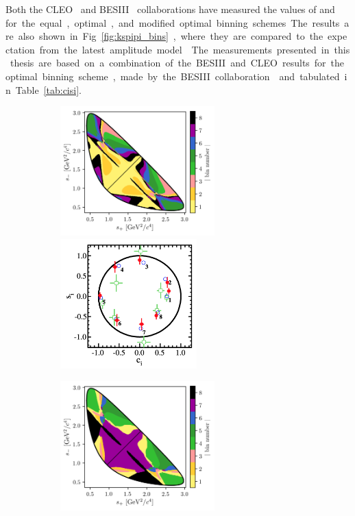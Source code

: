 Both the CLEO~\cite{CLEOCISI} and BESIII~\cite{BESCISI} collaborations have measured the values of \ci and \si for the equal, optimal, and modified optimal binning schemes. The results are also shown in Fig.~\ref{fig:kspipi_bins}, where they are  compared to the expectation from the latest amplitude model~\cite{Belle2018}. The measurements presented in this thesis are based on a combination of the BESIII and CLEO results for the optimal binning scheme, made by the BESIII collaboration~\cite{BESCISI} and tabulated in Table~\ref{tab:cisi}. 

\begin{figure}[p]
    \centering
    \begin{subfigure}{\columnwidth}
        \centering
        \includegraphics[height=5cm]{figures/theory/binnings/KsPiPi_equal.png}
        \includegraphics[height=5cm]{figures/theory/cisi_equal.png}
        \caption{}
        \label{fig:kspipi_bins_equal}
    \end{subfigure}
    \begin{subfigure}{\columnwidth}
        \centering
        \includegraphics[height=5cm]{figures/theory/binnings/KsPiPi_optimal.png}

\end{subfigure}
\end{figure}
